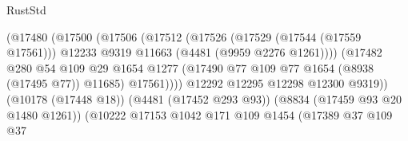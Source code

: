 \begin{lexlean}{RustStd}
\begin{coremodule}
                                                (@17480
                                                  (@17500
                                                    (@17506
                                                      (@17512
                                                        (@17526
                                                          (@17529 (@17544 (@17559 @17561)))
                                                          @12233
                                                          @9319
                                                          @11663
                                                          (@4481 (@9959 @2276 @1261))))
                                                      (@17482
                                                        @280
                                                        @54
                                                        @109
                                                        @29
                                                        @1654
                                                        @1277
                                                        (@17490
                                                          @77
                                                          @109
                                                          @77
                                                          @1654
                                                          (@8938 (@17495 @77))
                                                          @11685)
                                                        @17561))))
                                                @12292
                                                @12295
                                                @12298
                                                @12300
                                                @9319))
                                            (@10178 (@17448 @18))
                                            (@4481 (@17452 @293 @93))
                                            (@8834 (@17459 @93 @20 @1480 @1261))
                                            (@10222
                                              @17153
                                              @1042
                                              @171
                                              @109
                                              @1454
                                              (@17389
                                                @37
                                                @109
                                                @37

\end{coremodule}
\end{lexlean}
